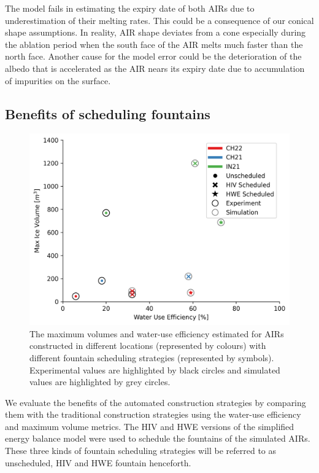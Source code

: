 \documentclass[tc, manuscript]{copernicus}
\begin{document}
The model fails in estimating the expiry date of both AIRs due to underestimation of their melting rates. This
could be a consequence of our conical shape assumptions. In reality, AIR shape deviates from a cone especially
during the ablation period when the south face of the AIR melts much faster than the north face. Another cause
for the model error could be the deterioration of the albedo that is accelerated as the AIR nears its expiry
date due to accumulation of impurities on the surface.

\subsection{Benefits of scheduling fountains}

\begin{figure}[t]
\includegraphics[width=12cm]{Figures/wue.png}

\caption{The maximum volumes and water-use efficiency estimated for AIRs constructed in different locations
(represented by colours) with different fountain scheduling strategies (represented by symbols). Experimental
values are highlighted by black circles and simulated values are highlighted by grey circles.  }

\label{fig:wue}
\end{figure}

We evaluate the benefits of the automated construction strategies by comparing them with the traditional
construction strategies using the water-use efficiency and maximum volume metrics. The HIV and HWE versions
of the simplified energy balance model were used to schedule the fountains of the simulated AIRs. These three
kinds of fountain scheduling strategies will be referred to as unscheduled, HIV and HWE fountain henceforth. 
\end{document}
